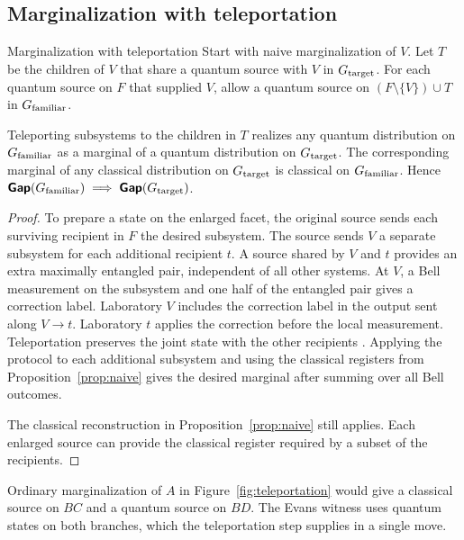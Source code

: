 \subsection{Marginalization with teleportation}\label{sec:teleportation}
\begin{piggyback}{Marginalization with teleportation}
Start with naive marginalization of \(V\). Let \(T\) be the children of \(V\)
that share a quantum source with \(V\) in \(G_{\text{target}}\). For each quantum
source on \(F\) that supplied \(V\), allow a quantum source on
\((F\setminus\{V\})\cup T\) in \(G_{\text{familiar}}\).
\end{piggyback}
\begin{proposition}\label{prop:teleportation}
Teleporting subsystems to the children in \(T\) realizes any quantum
distribution on \(G_{\text{familiar}}\) as a marginal of a quantum distribution on
\(G_{\text{target}}\). The corresponding marginal of any classical distribution on
\(G_{\text{target}}\) is classical on \(G_{\text{familiar}}\). Hence
\(\operatorname{\text{\normalfont\sffamily\bfseries Gap}}(G_{\text{familiar}})\implies\operatorname{\text{\normalfont\sffamily\bfseries Gap}}(G_{\text{target}})\).
\end{proposition}
\begin{proof}
To prepare a state on the enlarged facet, the original source sends each
surviving recipient in \(F\) the desired subsystem. The source sends \(V\) a
separate subsystem for each additional recipient \(t\). A source shared by
\(V\) and \(t\) provides an extra maximally entangled pair, independent of
all other systems. At \(V\), a Bell measurement on the subsystem and one
half of the entangled pair gives a correction label. Laboratory \(V\)
includes the correction label in the output sent along \(V\to t\).
Laboratory \(t\) applies the correction before the local measurement.
Teleportation preserves the joint state with the other recipients
\cite{Teleport}. Applying the protocol to each additional subsystem and
using the classical registers from Proposition~\ref{prop:naive} gives the
desired marginal after summing over all Bell outcomes.

The classical reconstruction in Proposition~\ref{prop:naive} still
applies. Each enlarged source can provide the classical register required
by a subset of the recipients.
\end{proof}
Ordinary marginalization of \(A\) in Figure~\ref{fig:teleportation}
would give a classical source on \(BC\) and a quantum source on \(BD\).
The Evans witness uses quantum states on both branches, which the
teleportation step supplies in a single move.

